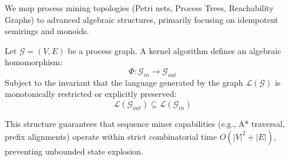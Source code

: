 We map process mining topologies (Petri nets, Process Trees, Reachability Graphs) to advanced algebraic structures, primarily focusing on idempotent semirings and monoids.

Let $\mathcal{G} = (V, E)$ be a process graph. A kernel algorithm defines an algebraic homomorphism:
\[ \Phi : \mathcal{G}_{in} \to \mathcal{G}_{out} \]
Subject to the invariant that the language generated by the graph $\mathcal{L}(\mathcal{G})$ is monotonically restricted or explicitly preserved:
\[ \mathcal{L}(\mathcal{G}_{out}) \subseteq \mathcal{L}(\mathcal{G}_{in}) \]

This structure guarantees that sequence miner capabilities (e.g., A* traversal, prefix alignments) operate within strict combinatorial time $O(|V|^2 + |E|)$, preventing unbounded state explosion.
